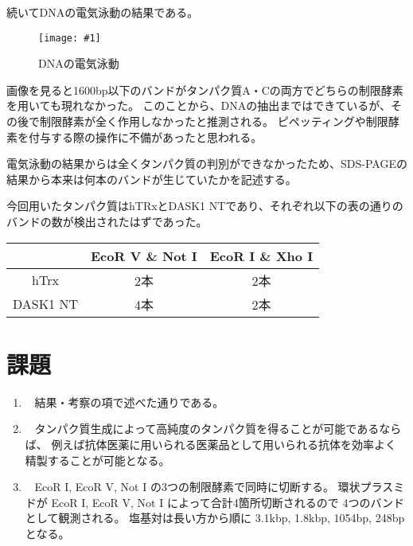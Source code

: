 \documentclass[a4paper,papersize,dvipdfmx]{jsarticle}
\newcommand{\piccap}[3]{\begin{figure}[H] \centering \texttt{[image: \#1]} \caption{#3} \label{fig {#1}} \end{figure}} %
\newcommand{\mon}[1]{\item[({#1})] \ }
\begin{document}
続いてDNAの電気泳動の結果である。
\piccap{plus.jpg}{8}{DNAの電気泳動}

画像を見ると1600bp以下のバンドがタンパク質A・Cの両方でどちらの制限酵素を用いても現れなかった。
このことから、DNAの抽出まではできているが、その後で制限酵素が全く作用しなかったと推測される。
ピペッティングや制限酵素を付与する際の操作に不備があったと思われる。

電気泳動の結果からは全くタンパク質の判別ができなかったため、SDS-PAGEの結果から本来は何本のバンドが生じていたかを記述する。

今回用いたタンパク質はhTRxとDASK1 NTであり、それぞれ以下の表の通りのバンドの数が検出されたはずであった。

\begin{table}[H]
\centering
\begin{tabular}{@{}ccc@{}}
\toprule
& EcoR V \& Not I & EcoR I \& Xho I \\ \midrule
hTrx     & 2本              & 2本              \\
DASK1 NT & 4本              & 2本              \\ \bottomrule
\end{tabular}
\end{table}


\section*{課題}

\begin{enumerate}
\mon{1} 結果・考察の項で述べた通りである。

\mon{2} タンパク質生成によって高純度のタンパク質を得ることが可能であるならば、
例えば抗体医薬に用いられる医薬品として用いられる抗体を効率よく精製することが可能となる。

\mon{3} EcoR I, EcoR V, Not I の3つの制限酵素で同時に切断する。
環状プラスミドが EcoR I, EcoR V, Not I によって合計4箇所切断されるので
4つのバンドとして観測される。
塩基対は長い方から順に 3.1kbp, 1.8kbp, 1054bp, 248bp となる。
\end{enumerate}
\end{document}
